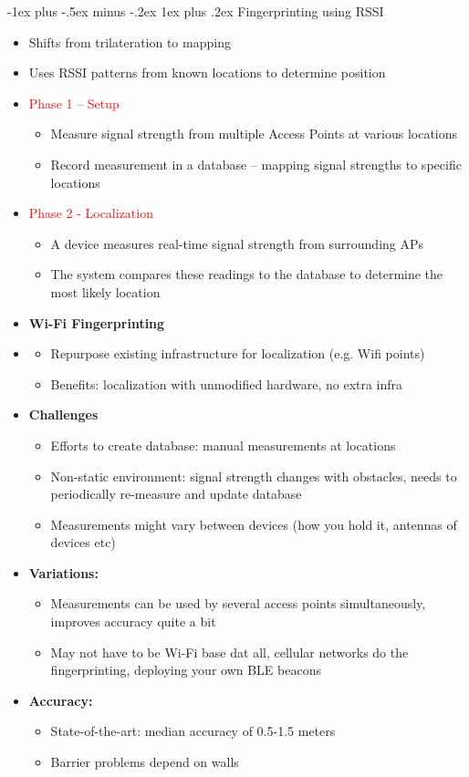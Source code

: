 \documentclass[10pt,landscape]{article}
\makeatletter
\newcommand{\subsubsubsection}{\@startsection{subsubsection}{3}{0mm}%
                                {-1ex plus -.5ex minus -.2ex}%
                                {1ex plus .2ex}%
                                {\normalfont\scriptsize\bfseries}}
\newcommand{\1}{\mathmybb{1}}
\makeatother
\begin{document}
\begin{multicols*}{3}
\subsubsubsection{Fingerprinting using RSSI}
\begin{itemize}
  \item Shifts from trilateration to mapping
  \item Uses RSSI patterns from known locations to determine position
  \item \textcolor{red}{Phase 1 – Setup}
  \begin{itemize}
    \item Measure signal strength from multiple Access Points at various locations
    \item Record measurement in a database – mapping signal strengths to specific locations
  \end{itemize}
  \item \textcolor{red}{Phase 2 - Localization}
  \begin{itemize}
    \item A device measures real-time signal strength from surrounding APs
    \item The system compares these readings to the database to determine the most likely location
  \end{itemize}
  \item \textbf{Wi-Fi Fingerprinting}
  \item \begin{itemize}
    \item Repurpose existing infrastructure for localization (e.g. Wifi points)
    \item Benefits: localization with unmodified hardware, no extra infra
  \end{itemize}
  \item \textbf{Challenges}
  \begin{itemize}
    \item Efforts to create database: manual measurements at locations
    \item Non-static environment: signal strength changes with obstacles, needs to periodically re-measure and update database
    \item Measurements might vary between devices (how you hold it, antennas of devices etc)
  \end{itemize}
  \item \textbf{Variations:}
  \begin{itemize}
    \item Measurements can be used by several access points simultaneously, improves accuracy quite a bit
    \item May not have to be Wi-Fi base dat all, cellular networks do the fingerprinting, deploying your own BLE beacons
  \end{itemize}
  \item \textbf{Accuracy:}
  \begin{itemize}
    \item State-of-the-art: median accuracy of 0.5-1.5 meters
    \item Barrier problems depend on walls
  \end{itemize}
\end{itemize}


\end{multicols*}
\end{document}
